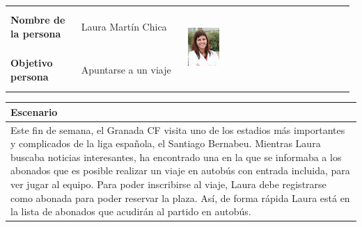\documentclass[11pt]{article}
\begin{document}
\begin{table}[H]
  \centering
  \begin{tabular}{p{0.2\linewidth}|p{0.3\linewidth}p{0.475\linewidth}}
    \toprule
    \textbf{Nombre de la persona} & Laura Martín Chica &\multirow{2}{*}{\begin{minipage}{1.\textwidth}\includegraphics[width=0.2\textwidth, height=30mm]{Ana}\end{minipage}}\\
    \textbf{Objetivo persona} & Apuntarse a un viaje & \\
    \bottomrule
  \end{tabular}

\begin{tabular}{p{1.028\linewidth}}
  \textbf{Escenario}\\
  \midrule
  Este fin de semana, el Granada CF visita uno de los estadios más importantes y complicados de la liga española, el Santiago Bernabeu. Mientras Laura buscaba noticias interesantes, ha encontrado una en la que se informaba a los abonados que es posible realizar un viaje en autobús con entrada incluida, para ver jugar al equipo. Para poder inscribirse al viaje, Laura debe registrarse como abonada para poder reservar la plaza.
Así, de forma rápida Laura está en la lista de abonados que acudirán al partido en autobús. 
\end{tabular}
\end{table}
\end{document}
